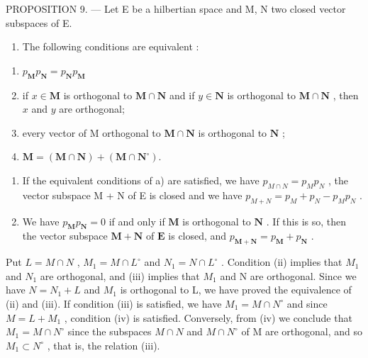 PROPOSITION 9. --- Let E be a hilbertian space and M, N two closed vector subspaces of E.

\begin{enumerate}
\def\labelenumi{\alph{enumi})}
\tightlist
\item
  The following conditions are equivalent :
\end{enumerate}

\begin{enumerate}
\def\labelenumi{(\roman{enumi})}
\item
  \(p_{\mathbf{M}}p_{\mathbf{N}} = p_{\mathbf{N}}p_{\mathbf{M}}\)
\item
  if \(x \in \mathbf{M}\) is orthogonal to \(\mathbf{M} \cap \mathbf{N}\) and if \(y \in \mathbf{N}\) is orthogonal to \(\mathbf{M} \cap \mathbf{N}\) , then \(x\) and \(y\) are orthogonal;
\item
  every vector of M orthogonal to \(\mathbf{M} \cap \mathbf{N}\) is orthogonal to \(\mathbf{N}\) ;
\item
  \(\mathbf{M} = (\mathbf{M}\cap \mathbf{N}) + (\mathbf{M}\cap \mathbf{N}^{\circ}).\)
\end{enumerate}

\begin{enumerate}
\def\labelenumi{\alph{enumi})}
\setcounter{enumi}{1}
\item
  If the equivalent conditions of a) are satisfied, we have \(p_{M \cap N} = p_{M} p_{N}\) , the vector subspace M + N of E is closed and we have \(p_{M + N} = p_{M} + p_{N} - p_{M} p_{N}\) .
\item
  We have \(p_{\mathbf{M}}p_{\mathbf{N}} = 0\) if and only if \(\mathbf{M}\) is orthogonal to \(\mathbf{N}\) . If this is so, then the vector subspace \(\mathbf{M} + \mathbf{N}\) of \(\mathbf{E}\) is closed, and \(p_{\mathbf{M} + \mathbf{N}} = p_{\mathbf{M}} + p_{\mathbf{N}}\) .
\end{enumerate}

Put \(L = M \cap N\) , \(M_{1} = M \cap L^{\circ}\) and \(N_{1} = N \cap L^{\circ}\) . Condition (ii) implies that \(M_{1}\) and \(N_{1}\) are orthogonal, and (iii) implies that \(M_{1}\) and N are orthogonal. Since we have \(N = N_{1} + L\) and \(M_{1}\) is orthogonal to L, we have proved the equivalence of (ii) and (iii). If condition (iii) is satisfied, we have \(M_{1} = M \cap N^{\circ}\) and since \(M = L + M_{1}\) , condition (iv) is satisfied. Conversely, from (iv) we conclude that \(M_{1} = M \cap N^{\circ}\) since the subspaces \(M \cap N\) and \(M \cap N^{\circ}\) of M are orthogonal, and so \(M_{1} \subset N^{\circ}\) , that is, the relation (iii).

